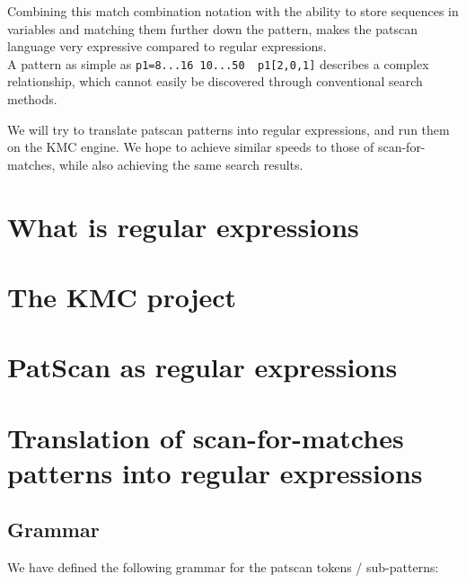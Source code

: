 \documentclass[12pt]{article}
\begin{document}
Combining this match combination notation with the ability to store sequences in variables and matching them further down the pattern, makes the patscan language very expressive compared to regular expressions. \\
A pattern as simple as \texttt{p1=8...16 10...50 ~p1[2,0,1]} describes a complex relationship, which cannot easily be discovered through conventional search methods.

We will try to translate patscan patterns into regular expressions, and run them on the KMC engine. We hope to achieve similar speeds to those of scan-for-matches, while also achieving the same search results.

\newpage

\section{What is regular expressions}

\newpage

\section{The KMC project}

\newpage

\section{PatScan as regular expressions}

\newpage

\section{Translation of scan-for-matches patterns into regular expressions}

\subsection{Grammar}
\label{Patscan grammar}

We have defined the following grammar for the patscan tokens / sub-patterns: \\
\end{document}
